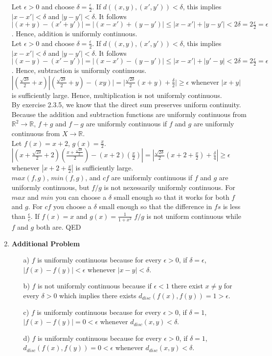 \documentclass[10pt]{article}
\begin{document}
\begin{enumerate}[label=Problem \arabic*.]
    Let $\epsilon>0$ and choose $\delta=\frac{\epsilon}{2}$.
    If $d((x,y),(x',y'))<\delta$, this implies $|x-x'|<\delta$ and $|y-y'|<\delta$.
    It follows $|(x+y)-(x'+y')|=|(x-x')+(y-y')|\le|x-x'|+|y-y'|<2\delta=2\frac{\epsilon}{2}=\epsilon$.
    Hence, addition is uniformly continuous.\\
    Let $\epsilon>0$ and choose $\delta=\frac{\epsilon}{2}$.
    If $d((x,y),(x',y'))<\delta$, this implies $|x-x'|<\delta$ and $|y-y'|<\delta$.
    It follows $|(x-y)-(x'-y')|=|(x-x')-(y-y')|\le|x-x'|+|y'-y|<2\delta=2\frac{\epsilon}{2}=\epsilon$.
    Hence, subtraction is uniformly continuous.\\
    $|(\frac{\sqrt{2\delta}}{2}+x)|(\frac{\sqrt{2\delta}}{2}+y)-(xy)|=|\frac{\sqrt{2\delta}}{2}(x+y)+\frac{\delta}{2}|\ge \epsilon$ whenever $|x+y|$ is sufficiently large. 
    Hence, multiplication is not uniformly continuous.\\
    By exercise 2.3.5, we know that the direct sum preserves uniform continuity. 
    Because the addition and subtraction functions are uniformly continuous from $\mathbb{R}^2\rightarrow\mathbb{R}$, $f+g$ and $f-g$ are uniformly continuous if $f$ and $g$ are uniformly continuous from $X\rightarrow\mathbb{R}$.\\
    Let $f(x)=x+2$, $g(x)=\frac{x}{2}$. $|(x+\frac{\sqrt{2\delta}}{2}+2)(\frac{x+\frac{\sqrt{2\delta}}{2}}{2})-(x+2)(\frac{x}{2})|=|\frac{\sqrt{2\delta}}{2}(x+2+\frac{x}{2})+\frac{\delta}{4}|\ge\epsilon$ whenever $|x+2+\frac{x}{2}|$ is sufficiently large.\\
    $max(f,g)$, $min(f,g)$, and $cf$ are uniformly continuous if $f$ and $g$ are uniformly continuous, but $f/g$ is not nexessarily uniformly continuous. 
    For $max$ and $min$ you can choose a $\delta$ small enough so that it works for both $f$ and $g$. 
    For $cf$ you choose a $\delta$ small enough so that the difference in $fs$ is less than $\frac{\epsilon}{c}$. 
    If $f(x)=x$ and $g(x)=\frac{1}{1+x^2}$ $f/g$ is not uniform continuous while $f$ and $g$ both are.
    QED
    \item \textbf{Additional Problem}\par  
    \begin{itemize}
        \item [a)] $f$ is uniformly continuous because for every $\epsilon>0$, if $\delta=\epsilon$, $|f(x)-f(y)|<\epsilon$ whenever $|x-y|<\delta$. 
        \item [b)] $f$ is not uniformly continuous because if $\epsilon<1$ there exist $x\neq y$ for every $\delta>0$ which implies there exists $d_{disc}(f(x),f(y))=1>\epsilon$.
        \item [c)] $f$ is uniformly continuous because for every $\epsilon>0$, if $\delta=1$, $|f(x)-f(y)|=0<\epsilon$ whenever $d_{disc}(x,y)<\delta$.
        \item [d)] $f$ is uniformly continuous because for every $\epsilon>0$, if $\delta=1$, $d_{disc}(f(x),f(y))=0<\epsilon$ whenever $d_{disc}(x,y)<\delta$.
    \end{itemize}
\end{enumerate}
\end{document}
